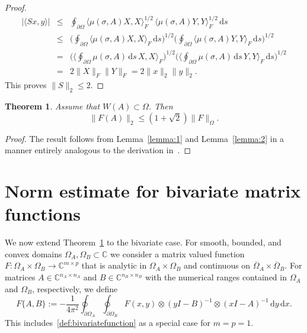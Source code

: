 \documentclass[11pt,a4paper]{amsart}
\newtheorem{theorem}{Theorem}[section]
\newcommand{\C}{{\mathbb C}}
\begin{document}
\begin{proof}
\begin{eqnarray*}
 | \langle Sx,y\rangle | &\le&  
 \oint_{\partial \Omega} \big\langle \mu(\sigma,A)X,X \big\rangle_F^{1/2}\, \big\langle \mu(\sigma,A)Y,Y \big\rangle_F^{1/2}\,\mathrm{d}s \\
 &\le & \Big( \oint_{\partial \Omega} \big\langle \mu(\sigma,A)X,X \big\rangle_F\,\mathrm{d}s \Big)^{1/2}
 \Big( \oint_{\partial \Omega} \big\langle \mu(\sigma,A)Y,Y \big\rangle_F\,\mathrm{d}s \Big)^{1/2} \\
 &=& \Big( \Big\langle \oint_{\partial \Omega}  \mu(\sigma,A)\,\mathrm{d}s\, X,X \Big\rangle_F \Big)^{1/2}
 \Big( \Big\langle \oint_{\partial \Omega}  \mu(\sigma,A)\,\mathrm{d}s\, Y,Y \Big\rangle_F\,\mathrm{d}s \Big)^{1/2} \\
 &=& 2 \|X\|_F \|Y\|_F = 2\|x\|_2\|y\|_2. 
\end{eqnarray*}
This proves $\|S\|_2\le 2$.
\end{proof}

\begin{theorem} \label{theorem:crouzeixpalencia}
Assume that $W(A)\subset \Omega$. Then 
\[
\|F(A)\|_2 \le (1+\sqrt{2}) \|F\|_\Omega.
\]
\end{theorem}
\begin{proof}
The result follows from Lemma~\ref{lemma:1} and Lemma~\ref{lemma:2} in a manner entirely analogous to the derivation in~\cite[Sec. 2]{Ransford2018}. 
\end{proof}

\section{Norm estimate for bivariate matrix functions}

We now extend Theorem~\ref{theorem:crouzeixpalencia} to the bivariate case. For smooth, bounded, and convex domains $\Omega_A,\Omega_B \subset \C$ we consider a matrix valued function $F:\Omega_A\times\Omega_B\to \C^{m\times p}$ that is analytic in $\Omega_A\times \Omega_B$ and continuous on $\overline{\Omega}_A \times \overline{\Omega}_B$. For matrices $A \in\C^{n_A\times n_A}$ and $B \in \C^{n_B\times n_B}$ with the numerical ranges contained in $\Omega_A$ and $\Omega_B$, respectively, we define
\begin{equation} \label{eq:bivariatematrixvalued}
 F\{A,B\} := -\frac{1}{4\pi^2} \oint_{\partial \Omega_A} \oint_{\partial \Omega_B} F(x,y) \otimes (yI-B)^{-1} \otimes (xI-A)^{-1}\,\text{d}y\,\text{d}x.
\end{equation}
This includes~\eqref{def:bivariatefunction} as a special case for $m = p = 1$.
\end{document}
